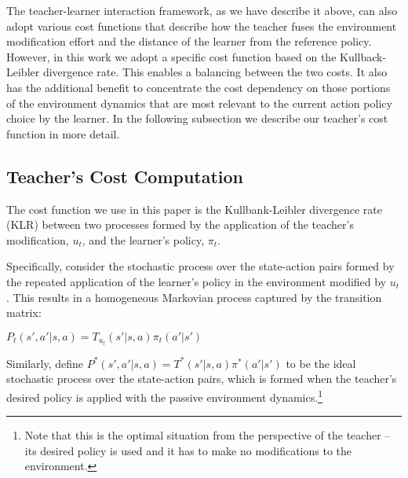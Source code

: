 \documentclass[letterpaper]{aamas2010}
\begin{document}
The teacher-learner interaction framework, as we have describe it
above, can also adopt various cost functions that describe how the
teacher fuses the environment modification effort and the distance of
the learner from the reference policy. However, in this work we adopt
a specific cost function based on the Kullback-Leibler divergence
rate. This enables a balancing between the two costs. It also
has the additional benefit to concentrate the cost dependency on those
portions of the environment dynamics that are most relevant to the
current action policy choice by the learner. In the following
subsection we describe our teacher's cost function in more detail.

\subsection{Teacher's Cost Computation}

The cost function we use in this paper is the Kullbank-Leibler divergence rate (KLR) between two processes formed by the application of the teacher's modification, $u_t$, and the learner's policy,
 $\pi_t$.


Specifically, consider 
%
the stochastic process over the state-action pairs formed by the
repeated application of the learner's policy in the environment
modified by $u_t$. This results in  a homogeneous Markovian process captured 
by the transition matrix: \\ \centerline{$
  P_t(s',a'|s,a)=T_{u_t}(s'|s,a)\pi_t(a'|s') $}

Similarly, define $P^*(s',a'|s,a)=T^*(s'|s,a)\pi^*(a'|s')$ to be the
ideal stochastic process over the state-action pairs, which is formed when the teacher's desired policy is applied with the passive environment dynamics.\footnote{Note that this is the optimal situation from the perspective of the teacher -- its desired policy is used and it has to make no modifications to the environment.} 
\end{document}
